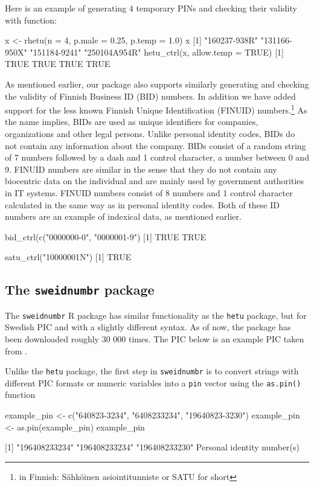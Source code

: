 Here is an example of generating 4 temporary PINs and checking their validity with  function:

\begin{example}
  x <- rhetu(n = 4, p.male = 0.25, p.temp = 1.0)
  x
  [1] "160237-938R" "131166-950X" "151184-9241" "250104A954R"
  hetu_ctrl(x, allow.temp = TRUE)
  [1] TRUE TRUE TRUE TRUE
\end{example}

As mentioned earlier, our package also supports similarly generating and checking the validity of Finnish Business ID (BID) numbers. In addition we have added support for the less known Finnish Unique Identification (FINUID) numbers.\footnote{in Finnish: Sähköinen asiointitunniste or SATU for short} As the name implies, BIDs are used as unique identifiers for companies, organizations and other legal persons. Unlike personal identity codes, BIDs do not contain any information about the company. BIDs consist of a random string of 7 numbers followed by a dash and 1 control character, a number between 0 and 9. FINUID numbers are similar in the sense that they do not contain any biocentric data on the individual and are mainly used by government authorities in IT systems. FINUID numbers consist of 8 numbers and 1 control character calculated in the same way as in personal identity codes. Both of these ID numbers are an example of indexical data, as mentioned earlier.

\begin{example}
  bid_ctrl(c("0000000-0", "0000001-9")
  [1] TRUE TRUE

  satu_ctrl("10000001N")
  [1] TRUE
\end{example}

\subsection{The \texttt{sweidnumbr} package}

The \texttt{sweidnumbr} R package has similar functionality as the \texttt{hetu} package, but for Swedish PIC and with a slightly different syntax. As of now, the package has been downloaded roughly 30 000 times. The PIC below is an example PIC taken from \citet{sv2007}.

Unlike the \texttt{hetu} package, the first step in \texttt{sweidnumbr} is to convert strings with different PIC formats or numeric variables into a \texttt{pin} vector using the \texttt{as.pin()} function

\begin{example}
  example_pin <- c("640823-3234", "6408233234", "19640823-3230")
  example_pin <- as.pin(example_pin)
  example_pin

  [1] "196408233234" "196408233234" "196408233230"
  Personal identity number(s)
\end{example}


